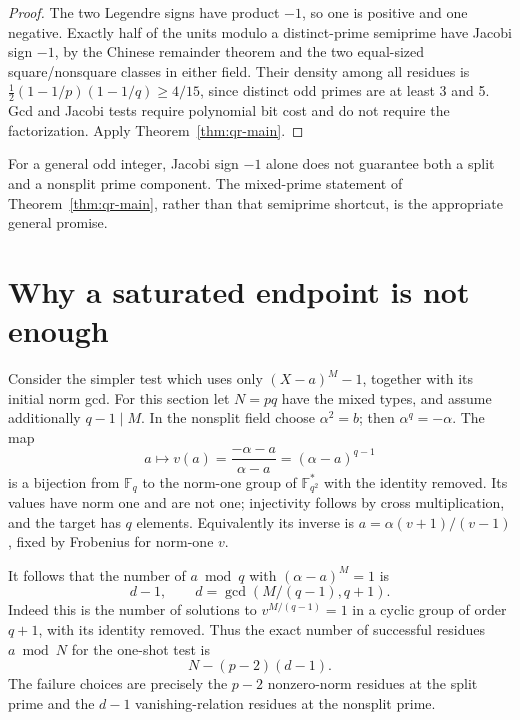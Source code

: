 \begin{proof}
The two Legendre signs have product $-1$, so one is positive and one
negative.  Exactly half of the units modulo a distinct-prime semiprime
have Jacobi sign $-1$, by the Chinese remainder theorem and the two
equal-sized square/nonsquare classes in either field.
Their density among all residues is
$\frac12(1-1/p)(1-1/q)\geq4/15$, since distinct odd primes are at
least 3 and 5.  Gcd and Jacobi tests require polynomial bit cost and
do not require the factorization.  Apply Theorem~\ref{thm:qr-main}.
\end{proof}

For a general odd integer, Jacobi sign $-1$ alone does not guarantee
both a split and a nonsplit prime component.  The mixed-prime statement
of Theorem~\ref{thm:qr-main}, rather than that semiprime shortcut, is
the appropriate general promise.

\section{Why a saturated endpoint is not enough}
\label{sec:qr-saturation}

Consider the simpler test which uses only
$(X-a)^M-1$, together with its initial norm gcd.
For this section let $N=pq$ have the mixed types, and assume additionally
$q-1\mid M$.  In the nonsplit field choose $\alpha^2=b$; then
$\alpha^q=-\alpha$.  The map
\begin{equation}
 a\longmapsto v(a)=\frac{-\alpha-a}{\alpha-a}
                  =(\alpha-a)^{q-1}
 \label{eq:qr-norm-one-map}
\end{equation}
is a bijection from $\mathbb F_q$ to the norm-one group of
$\mathbb F_{q^2}^*$ with the identity removed.
Its values have norm one and are not one; injectivity follows by cross
multiplication, and the target has $q$ elements.
Equivalently its inverse is
$a=\alpha(v+1)/(v-1)$, fixed by Frobenius for norm-one $v$.

It follows that the number of $a\bmod q$ with $(\alpha-a)^M=1$ is
\begin{equation}
 d-1,\qquad d=\gcd(M/(q-1),q+1).
 \label{eq:qr-one-shot-zeros}
\end{equation}
Indeed this is the number of solutions to $v^{M/(q-1)}=1$ in a cyclic
group of order $q+1$, with its identity removed.  Thus the exact number
of successful residues $a\bmod N$ for the one-shot test is
\begin{equation}
 N-(p-2)(d-1).
 \label{eq:qr-one-shot-count}
\end{equation}
The failure choices are precisely the $p-2$ nonzero-norm residues at
the split prime and the $d-1$ vanishing-relation residues at the
nonsplit prime.

